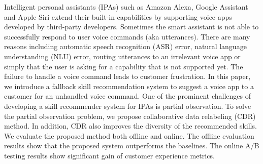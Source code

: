 Intelligent personal assistants (IPAs) such as Amazon Alexa, Google Assistant and Apple Siri extend their built-in capabilities by supporting voice apps developed by third-party developers. Sometimes the smart assistant is not able to successfully respond to user voice commands (aka utterances). There are many reasons including automatic speech recognition (ASR) error, natural language understanding (NLU) error, routing utterances to an irrelevant voice app or simply that the user is asking for a capability that is not supported yet. The failure to handle a voice command leads to customer frustration. In this paper, we introduce a fallback skill recommendation system to suggest a voice app to a customer for an unhandled voice command. One of the prominent challenges of developing a skill recommender system for IPAs is partial observation. To solve the partial observation problem, we propose collaborative data relabeling (CDR) method. In addition, CDR also improves the diversity of the recommended skills. We evaluate the proposed method both offline and online. The offline evaluation results show that the proposed system outperforms the baselines. The online A/B testing results show significant gain of customer experience metrics.
